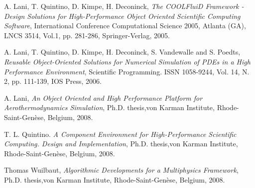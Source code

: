 \documentclass[11pt]{article}
\begin{document}
\begin{thebibliography}{00}

  A. Lani, T. Quintino, D. Kimpe, H. Deconinck, 
  {\it The COOLFluiD Framework - Design Solutions for High-Performance Object Oriented Scientific Computing Software}, 
  International Conference Computational Science 2005, Atlanta (GA), LNCS 3514, Vol.1, pp. 281-286, Springer-Verlag, 2005. 

  A. Lani, T. Quintino, D. Kimpe, H. Deconinck, S. Vandewalle and S. Poedts, 
  {\it Reusable Object-Oriented Solutions for Numerical Simulation of PDEs in a High Performance Environment}, 
  Scientific Programming. ISSN 1058-9244, Vol. 14, N. 2, pp. 111-139, IOS Press, 2006.

  A. Lani, {\it An Object Oriented and High Performance Platform for Aerothermodynamics Simulation}, 
  Ph.D. thesis,von Karman Institute, Rhode-Saint-Gen\`ese, Belgium, 2008.
  
  T. L. Quintino. {\it A Component Environment for High-Performance
    Scientific Computing. Design and Implementation},
  Ph.D. thesis,von Karman Institute, Rhode-Saint-Gen\`ese, Belgium, 2008.
  
  Thomas Wuilbaut, {\it Algorithmic Developments for a Multiphysics Framework},  
  Ph.D. thesis,von Karman Institute, Rhode-Saint-Gen\`ese, Belgium, 2008.
  
\end{thebibliography}
\end{document}
